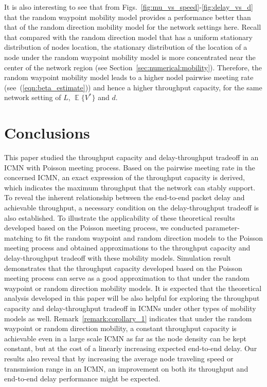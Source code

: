 \documentclass[twocolumn, 10pt]{svjour3}         \smartqed  \usepackage{graphicx}
\DeclareMathOperator*{\E}{\mathbb{E}}
\begin{document}
It is also interesting to see that from Figs.~\ref{fig:mu_vs_speed}-\ref{fig:delay_vs_d} that the random waypoint mobility model provides a performance better than that of the random direction mobility model for the network settings here.
Recall that compared with the random direction model that has a uniform stationary distribution of  nodes location, the stationary distribution of the location of a node under the random waypoint mobility model is more concentrated near the center of the network region (see Section~\ref{sec:numerical:mobility}).
Therefore,  the random waypoint mobility model leads to a higher nodel pairwise meeting rate (see~(\ref{eqn:beta_estimate})) and hence a higher throughput capacity, for the same network setting of $L$,  $\E\{V^*\}$ and $d$.



















\section{Conclusions}\label{sec:conclusion}
This paper studied the  throughput capacity and delay-throughput tradeoff in an ICMN with Poisson meeting process. Based on the pairwise meeting rate in the concerned ICMN, an exact expression of the throughput capacity is derived, which indicates the maximum throughput that the network can stably support.
To reveal the inherent relationship between the end-to-end packet delay and achievable throughput, a necessary condition on the delay-throughput tradeoff is also established.
To illustrate the applicability of these theoretical results developed based on the Poisson meeting process, we conducted parameter-matching to fit the random waypoint and random direction models to the Poisson meeting process and obtained approximations to the throughput capacity and delay-throughput tradeoff with these mobility models.
Simulation result demonstrates that the throughput capacity developed based on the Poisson meeting process can serve as a good approximation to that under the random waypoint or random direction mobility models.
It is expected that the theoretical analysis developed in this paper will be also helpful for exploring the throughput capacity and delay-throughput tradeoff in ICMNs under other types of mobility models as well. 
Remark~\ref{remark:corollary_1} indicates that under the random waypoint or random direction mobility, a constant  throughput capacity is achievable even in a large scale ICMN as far as the node density can be kept constant, but at the cost of a linearly increasing expected end-to-end delay. Our results also reveal that by increasing the average node traveling speed or transmission range in an ICMN, an improvement on both its throughput and end-to-end delay performance might be expected.





\end{document}
